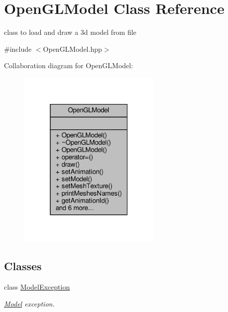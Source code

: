 \hypertarget{class_open_g_l_model}{}\section{Open\+G\+L\+Model Class Reference}
\label{class_open_g_l_model}


class to load and draw a 3d model from file  




{\ttfamily \#include $<$Open\+G\+L\+Model.\+hpp$>$}



Collaboration diagram for Open\+G\+L\+Model\+:
\nopagebreak
\begin{figure}[H]
\begin{center}
\leavevmode
\includegraphics[width=196pt]{class_open_g_l_model__coll__graph}
\end{center}
\end{figure}
\subsection*{Classes}
\begin{DoxyCompactItemize}
\item 
class \hyperlink{class_open_g_l_model_1_1_model_exception}{Model\+Exception}
\begin{DoxyCompactList}\small\item\em \hyperlink{class_model}{Model} exception. \end{DoxyCompactList}\end{DoxyCompactItemize}
